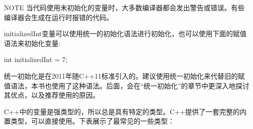 \begin{myNotic}{NOTE}
当代码使用未初始化的变量时，大多数编译器都会发出警告或错误。有些编译器会生成在运行时报错的代码。
\end{myNotic}

initializedInt变量可以使用统一的初始化语法进行初始化，也可以使用下面的赋值语法来初始化变量:

\begin{cpp}
int initializedInt = 7;
\end{cpp}

统一初始化是在2011年随C++11标准引入的。建议使用统一初始化来代替旧的赋值语法，本书也使用了这种语法。后面，会在“统一初始化”的章节中更深入地探讨其优点，以及推荐使用的原因。

C++中的变量是强类型的，所以总是具有特定的类型。C++提供了一套完整的内置类型，可以直接使用。下表展示了最常见的一些类型：

